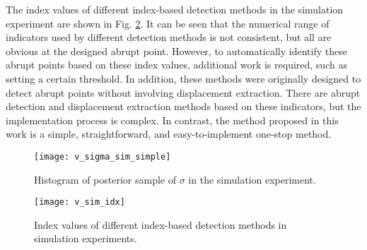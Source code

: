 \documentclass[final,3p,times]{elsarticle}
\begin{document}
	The index values of different index-based detection methods in the simulation experiment are shown in Fig. \ref{fig_v_sim_idx}.
	It can be seen that the numerical range of indicators used by different detection methods is not consistent, but all are obvious at the designed abrupt point.
	However, to automatically identify these abrupt points based on these index values, additional work is required, such as setting a certain threshold.
	In addition, these methods were originally designed to detect abrupt points without involving displacement extraction.
	There are abrupt detection and displacement extraction methods based on these indicators, but the implementation process is complex\cite{shen_shortterm2021}.
	In contrast, the method proposed in this work is a simple, straightforward, and easy-to-implement one-stop method.
	\begin{figure}[htbp]
		\centering
		\texttt{[image: v\_sigma\_sim\_simple]}
		\caption{Histogram of posterior sample of $\sigma$ in the simulation experiment.}
		\label{fig_v_sigma_sim_simple}
	\end{figure} 
	\begin{figure}[htbp]
	\centering
	\texttt{[image: v\_sim\_idx]}
	\caption{Index values of different index-based detection methods in simulation experiments.}
	\label{fig_v_sim_idx}
	\end{figure} 
\end{document}
